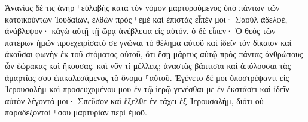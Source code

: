 \documentclass{openreader}
\begin{document}
Ἁνανίας δέ τις ἀνὴρ ⸀εὐλαβὴς κατὰ τὸν νόμον μαρτυρούμενος ὑπὸ πάντων τῶν κατοικούντων Ἰουδαίων, 
ἐλθὼν πρὸς ⸀ἐμὲ καὶ ἐπιστὰς εἶπέν μοι· Σαοὺλ ἀδελφέ, ἀνάβλεψον· κἀγὼ αὐτῇ τῇ ὥρᾳ ἀνέβλεψα εἰς αὐτόν. 
ὁ δὲ εἶπεν· Ὁ θεὸς τῶν πατέρων ἡμῶν προεχειρίσατό σε γνῶναι τὸ θέλημα αὐτοῦ καὶ ἰδεῖν τὸν δίκαιον καὶ ἀκοῦσαι φωνὴν ἐκ τοῦ στόματος αὐτοῦ, 
ὅτι ἔσῃ μάρτυς αὐτῷ πρὸς πάντας ἀνθρώπους ὧν ἑώρακας καὶ ἤκουσας. 
καὶ νῦν τί μέλλεις; ἀναστὰς βάπτισαι καὶ ἀπόλουσαι τὰς ἁμαρτίας σου ἐπικαλεσάμενος τὸ ὄνομα ⸀αὐτοῦ. 
Ἐγένετο δέ μοι ὑποστρέψαντι εἰς Ἰερουσαλὴμ καὶ προσευχομένου μου ἐν τῷ ἱερῷ γενέσθαι με ἐν ἐκστάσει 
καὶ ἰδεῖν αὐτὸν λέγοντά μοι· Σπεῦσον καὶ ἔξελθε ἐν τάχει ἐξ Ἰερουσαλήμ, διότι οὐ παραδέξονταί ⸀σου μαρτυρίαν περὶ ἐμοῦ. 
\end{document}
